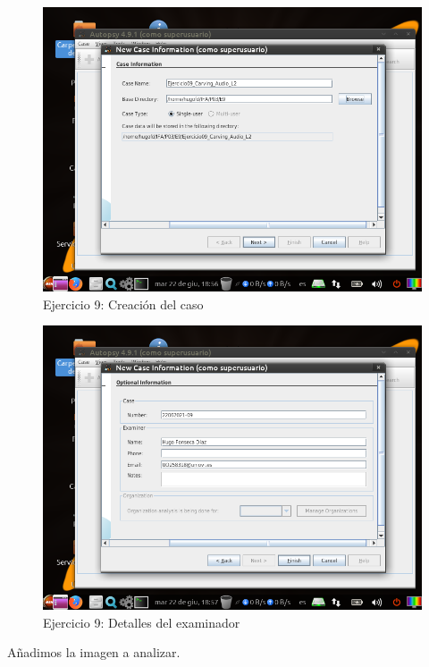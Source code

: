 \documentclass[11pt]{article}
\begin{document}
\begin{figure}[H]
    \caption{Ejercicio 9: Creación del caso}
    \centering
    \includegraphics[scale=0.7]{e9-1.png}
\end{figure}

\begin{figure}[H]
    \caption{Ejercicio 9: Detalles del examinador}
    \centering
    \includegraphics[scale=0.7]{e9-2.png}
\end{figure}

Añadimos la imagen a analizar.
\end{document}
